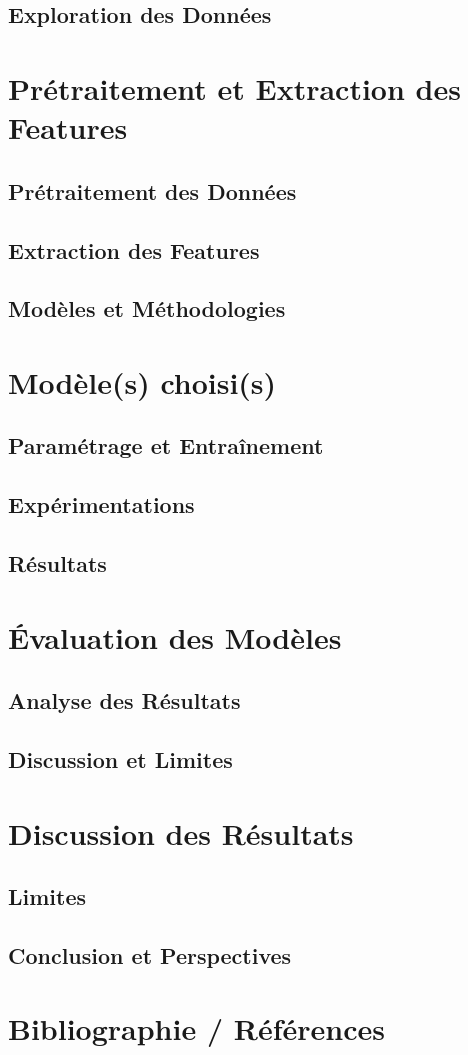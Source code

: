\documentclass{rapport}
\begin{document}
\subsection{Exploration des Données}

\section{Prétraitement et Extraction des Features}
\subsection{Prétraitement des Données}
\subsection{Extraction des Features}
\subsection{Modèles et Méthodologies}

\section{Modèle(s) choisi(s)}
\subsection{Paramétrage et Entraînement}
\subsection{Expérimentations}
\subsection{Résultats}

\section{Évaluation des Modèles}
\subsection{Analyse des Résultats}
\subsection{Discussion et Limites}

\section{Discussion des Résultats}
\subsection{Limites}
\subsection{Conclusion et Perspectives}

\section{Bibliographie / Références}



\end{document}
